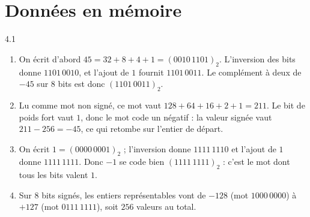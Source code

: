 \clearpage
\chapter{Données en mémoire}

\begin{corrige}{4.1}
\begin{enumerate}
\item On écrit d'abord $45 = 32 + 8 + 4 + 1 = (0010\,1101)_2$. L'inversion des bits donne $1101\,0010$, et l'ajout de $1$ fournit $1101\,0011$. Le complément à deux de $-45$ sur $8$ bits est donc $(1101\,0011)_2$.
\item Lu comme mot non signé, ce mot vaut $128 + 64 + 16 + 2 + 1 = 211$. Le bit de poids fort vaut $1$, donc le mot code un négatif : la valeur signée vaut $211 - 256 = -45$, ce qui retombe sur l'entier de départ.
\item On écrit $1 = (0000\,0001)_2$ ; l'inversion donne $1111\,1110$ et l'ajout de $1$ donne $1111\,1111$. Donc $-1$ se code bien $(1111\,1111)_2$ : c'est le mot dont tous les bits valent $1$.
\item Sur $8$ bits signés, les entiers représentables vont de $-128$ (mot $1000\,0000$) à $+127$ (mot $0111\,1111$), soit $256$ valeurs au total.
\end{enumerate}
\end{corrige}

